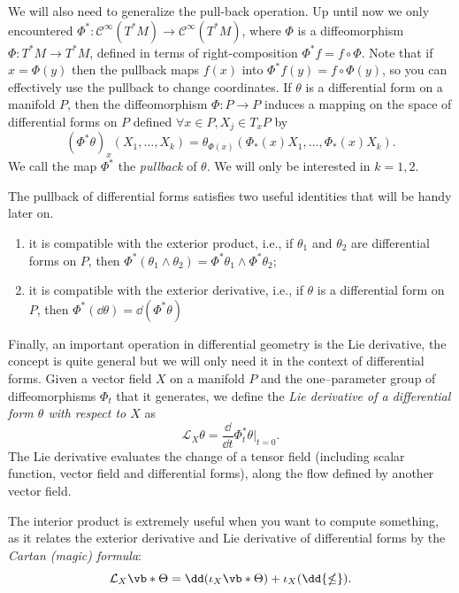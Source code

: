 \documentclass[english,fontsize=11pt,paper=b5]{scrbook}
\theoremstyle{definition}
\begin{document}
    We will also need to generalize the pull-back operation.
    Up until now we only encountered $\Phi^* : \mathcal{C}^\infty(T^*M) \to \mathcal{C}^\infty(T^*M)$, where $\Phi$ is a diffeomorphism $\Phi: T^*M \to T^*M$, defined in terms of right-composition $\Phi^* f = f \circ \Phi$.
    Note that if $x = \Phi(y)$ then the pullback maps $f(x)$ into $\Phi^* f (y) = f \circ \Phi (y)$, so you can effectively use the pullback to change coordinates.
    If $\theta$ is a differential form on a manifold $P$, then the diffeomorphism $\Phi : P \to P$ induces a mapping on the space of differential forms on $P$ defined $\forall x\in P, X_j\in T_xP$ by
    \begin{equation}
      (\Phi^{*}\theta)_{x}(X_{1},\ldots ,X_{k})=\theta_{\Phi(x)}(\Phi_*(x)X_{1},\ldots,\Phi_*(x)X_{k}).
    \end{equation}
    We call the map $\Phi^*$ the \emph{pullback} of $\theta$. We will only be interested in $k=1,2$.

    The pullback of differential forms satisfies two useful identities that will be handy later on.
    \begin{enumerate}
      \item it is compatible with the exterior product, i.e., if $\theta_1$ and $\theta_2$ are differential forms on $P$, then $\Phi^{*}(\theta_1 \wedge \theta_2) = \Phi^{*}\theta_1 \wedge \Phi^{*}\theta_2$;
      \item it is compatible with the exterior derivative, i.e., if $\theta$ is a differential form on $P$, then $\Phi^{*}(\dd\theta) = \dd(\Phi^{*}\theta)$
    \end{enumerate}

    Finally, an important operation in differential geometry is the Lie derivative, the concept is quite general but we will only need it in the context of differential forms.
    Given a vector field $X$ on a manifold $P$ and the one--parameter group of diffeomorphisms $\Phi_t$ that it generates, we define the \emph{Lie derivative of a differential form $\theta$ with respect to $X$} as
    \begin{equation}\label{eq:lie-derivative}
      \mathcal{L}_X \theta = \frac{\dd}{\dd t}\Phi_t^*\theta \Big|_{t=0}.
    \end{equation}
    The Lie derivative evaluates the change of a tensor field (including scalar function, vector field and differential forms), along the flow defined by another vector field.

    The interior product is extremely useful when you want to compute something, as it relates the exterior derivative and Lie derivative of differential forms by the \emph{Cartan (magic) formula}:
    \begin{equation}\label{eq:cartan}
      \mathcal{L}_X \vb*{\Theta} = \dd(\iota_X \vb*{\Theta}) + \iota_X (\dd{\mathbb{\Theta}}).
    \end{equation}
\end{document}
